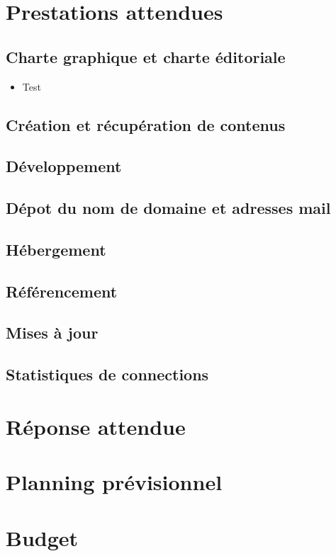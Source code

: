 \documentclass[oneside]{report}
\newcommand{\writecol}[1] {
	\subitem{\textcolor[HTML]{#1}{\# #1}}
}
\begin{document}
	\chapter{Prestations attendues}
	{
		\section{Charte graphique et charte éditoriale}
			\begin{itemize}
				\item{Test}
					\writecol{639D35}
			\end{itemize}
		\section{Création et récupération de contenus}
		\section{Développement}
		\section{Dépot du nom de domaine et adresses mail}
		\section{Hébergement}
		\section{Référencement}
		\section{Mises à jour}
		\section{Statistiques de connections}
	}

	\chapter{Réponse attendue}
	{
	
	}

	\chapter{Planning prévisionnel}
	{
	
	}

	\chapter{Budget}
	{
		
	}
\end{document}

